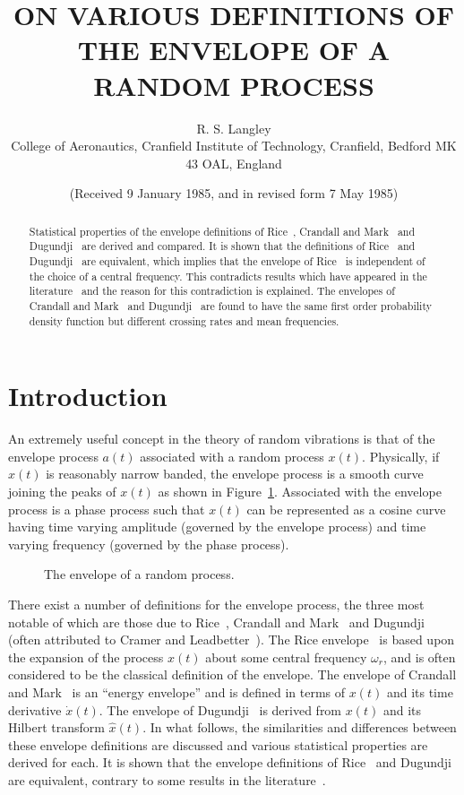 \documentclass[12pt]{article}
\title{ON VARIOUS DEFINITIONS OF THE ENVELOPE OF A RANDOM PROCESS}
\author{R. S. Langley \\ College of Aeronautics, Cranfield Institute of Technology, Cranfield, Bedford MK 43 OAL, England}
\date{(Received 9 January 1985, and in revised form 7 May 1985)}
\theoremstyle{plain}
\theoremstyle{definition}
\theoremstyle{remark}
\theoremstyle{plain}
\theoremstyle{definition}
\begin{document}
\maketitle

\begin{abstract}
Statistical properties of the envelope definitions of Rice~\cite{rice1954}, Crandall and Mark~\cite{crandall1963} and Dugundji~\cite{dugundji1958} are derived and compared. It is shown that the definitions of Rice~\cite{rice1954} and Dugundji~\cite{dugundji1958} are equivalent, which implies that the envelope of Rice~\cite{rice1954} is independent of the choice of a central frequency. This contradicts results which have appeared in the literature~\cite{lin1967,lin1976} and the reason for this contradiction is explained. The envelopes of Crandall and Mark~\cite{crandall1963} and Dugundji~\cite{dugundji1958} are found to have the same first order probability density function but different crossing rates and mean frequencies.
\end{abstract}

\section{Introduction}
An extremely useful concept in the theory of random vibrations is that of the envelope process $a(t)$ associated with a random process $x(t)$. Physically, if $x(t)$ is reasonably narrow banded, the envelope process is a smooth curve joining the peaks of $x(t)$ as shown in Figure~\ref{fig:envelope}. Associated with the envelope process is a phase process such that $x(t)$ can be represented as a cosine curve having time varying amplitude (governed by the envelope process) and time varying frequency (governed by the phase process).

\begin{figure}[h]
    \centering
    \caption{The envelope of a random process.}
    \label{fig:envelope}
\end{figure}

There exist a number of definitions for the envelope process, the three most notable of which are those due to Rice~\cite{rice1954}, Crandall and Mark~\cite{crandall1963} and Dugundji~\cite{dugundji1958} (often attributed to Cramer and Leadbetter~\cite{cramer1967}). The Rice envelope~\cite{rice1954} is based upon the expansion of the process $x(t)$ about some central frequency $\omega_{r}$, and is often considered to be the classical definition of the envelope. The envelope of Crandall and Mark~\cite{crandall1963} is an ``energy envelope'' and is defined in terms of $x(t)$ and its time derivative $\dot{x}(t)$. The envelope of Dugundji~\cite{dugundji1958} is derived from $x(t)$ and its Hilbert transform $\hat{x}(t)$. In what follows, the similarities and differences between these envelope definitions are discussed and various statistical properties are derived for each. It is shown that the envelope definitions of Rice~\cite{rice1954} and Dugundji~\cite{dugundji1958} are equivalent, contrary to some results in the literature~\cite{lin1967,lin1976}.
\end{document}
